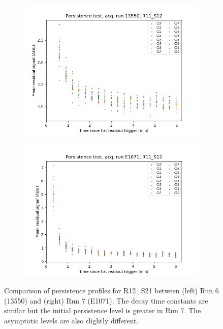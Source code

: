 \begin{figure}
\centering
\begin{subfigure}{0.5\textwidth}
  \centering
  \includegraphics[width=1.0\textwidth]{figures/baselineCharacterization/persistence_plot_LSSTCam_R11_S12_u_lsstccs_eo_persistence_13550_w_2023_41_20231117T001459Z.png}
\end{subfigure}%
\begin{subfigure}{0.5\textwidth}
  \centering
  \includegraphics[width=1\textwidth]{figures/baselineCharacterization/persistence_plot_LSSTCam_R11_S12_u_lsstccs_eo_persistence_E1071_w_2024_35_20240925T180602Z.png}
\end{subfigure}
\caption{Comparison of persistence profiles for R12\_S21 between (left) Run 6 (13550) and (right) Run 7 (E1071).  The decay time constants are similar but the initial persistence level is greater in Run 7.  The asymptotic levels are also slightly different.}
\label{fig:persistence-decay-comp}
\end{figure}

